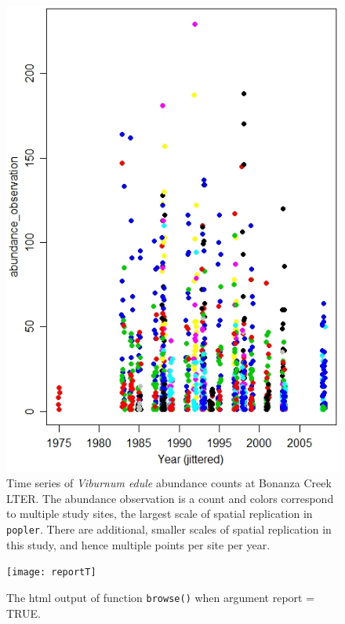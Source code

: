 \documentclass{article}\usepackage[]{graphicx}\usepackage[]{color}
\begin{document}
\newpage
\begin{figure}[h!]
  \begin{center}
    \includegraphics[scale=0.8]{BNZ_plot}
    \caption{Time series of \textit{Viburnum edule} abundance counts at Bonanza Creek LTER. The abundance observation is a count and colors correspond to multiple study sites, the largest scale of spatial replication in \texttt{popler}. There are additional, smaller scales of spatial replication in this study, and hence multiple points per site per year.}
    \label{Fig:BNZ_plot}
  \end{center}
\end{figure}

\newpage
\begin{figure}[h!]
  \begin{center}
    \texttt{[image: reportT]}
    \caption{The html output of function \texttt{browse()} when argument report = TRUE.}
    \label{Fig:reportT}
  \end{center}
\end{figure}
\end{document}
